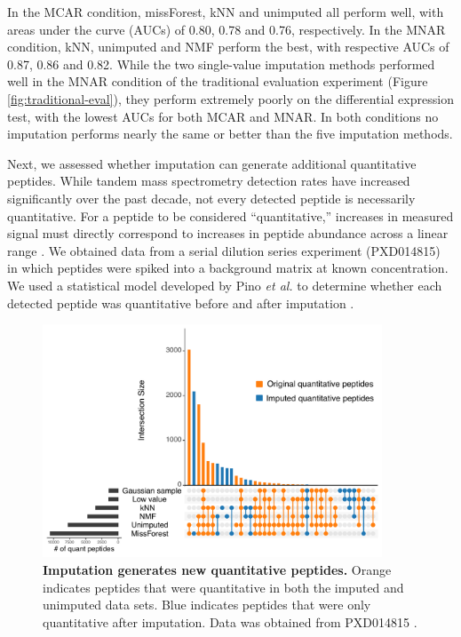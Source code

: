 \documentclass{article}
\begin{document}
In the MCAR condition, missForest, kNN and unimputed all perform well, with areas under the curve (AUCs) of 0.80, 0.78 and 0.76, respectively. In the MNAR condition, kNN, unimputed and NMF perform the best, with respective AUCs of 0.87, 0.86 and 0.82. While the two single-value imputation methods performed well in the MNAR condition of the traditional evaluation experiment (Figure \ref{fig:traditional-eval}), they perform extremely poorly on the differential expression test, with the lowest AUCs for both MCAR and MNAR. In both conditions no imputation performs nearly the same or better than the five imputation methods. 

Next, we assessed whether imputation can generate additional quantitative peptides. While tandem mass spectrometry detection rates have increased significantly over the past decade, not every detected peptide is necessarily quantitative. For a peptide to be considered ``quantitative,'' increases in measured signal must directly correspond to increases in peptide abundance across a linear range \cite{matrix-matched-calib}. We obtained data from a serial dilution series experiment (PXD014815) in which peptides were spiked into a background matrix at known concentration. We used a statistical model developed by Pino \textit{et al.} to determine whether each detected peptide was quantitative before and after imputation \cite{matrix-matched-calib}.

\begin{figure}[t]
  \centering
  \includegraphics[width=0.9\textwidth]{figures/upset-plot-v3.pdf}
  \caption{{\bf Imputation generates new quantitative peptides.} Orange indicates peptides that were quantitative in both the imputed and unimputed data sets. Blue indicates peptides that were only quantitative after imputation. Data was obtained from PXD014815 \cite{matrix-matched-calib}.}
  \label{fig:rescue-experiment}
\end{figure}
\end{document}
